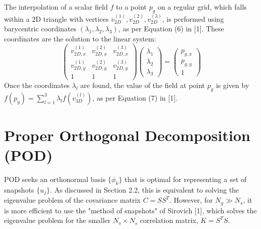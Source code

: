 \documentclass[dsc, EN]{ufabcFHZh}
\begin{document}
The interpolation of a scalar field $f$ to a point $p_g$ on a regular grid, which falls within a 2D triangle with vertices $v_{2D}^{(1)}, v_{2D}^{(2)}, v_{2D}^{(3)}$, is performed using barycentric coordinates $(\lambda_1, \lambda_2, \lambda_3)$, as per Equation (6) in {[1]}. These coordinates are the solution to the linear system:
\begin{equation}
\begin{pmatrix} v_{2D,x}^{(1)} & v_{2D,x}^{(2)} & v_{2D,x}^{(3)} \\ v_{2D,y}^{(1)} & v_{2D,y}^{(2)} & v_{2D,y}^{(3)} \\ 1 & 1 & 1 \end{pmatrix} \begin{pmatrix} \lambda_1 \\ \lambda_2 \\ \lambda_3 \end{pmatrix} = \begin{pmatrix} p_{g,x} \\ p_{g,y} \\ 1 \end{pmatrix}
\end{equation}
Once the coordinates $\lambda_l$ are found, the value of the field at point $p_g$ is given by $f(p_g) = \sum_{l=1}^{3} \lambda_l f(v_{3D}^{(l)})$, as per Equation (7) in {[1]}.

\section{Proper Orthogonal Decomposition (POD)}
\label{sec:pod_derivation}

POD seeks an orthonormal basis $\{\phi_k\}$ that is optimal for representing a set of snapshots $\{u_j\}$. As discussed in Section 2.2, this is equivalent to solving the eigenvalue problem of the covariance matrix $C = SS^T$. However, for $N_g \gg N_s$, it is more efficient to use the "method of snapshots" of Sirovich {[1]}, which solves the eigenvalue problem for the smaller $N_s \times N_s$ correlation matrix, $K = S^T S$.
\end{document}
